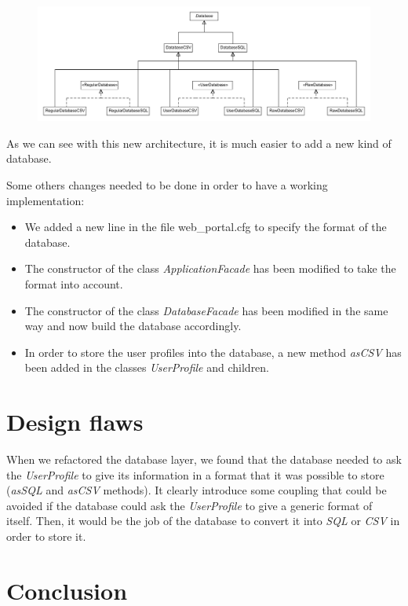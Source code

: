 \documentclass[a4paper,10pt]{report}
\begin{document}
\begin{figure}[h]
 \includegraphics[width=\textwidth]{ClassDiagram.png}
\end{figure}

As we can see with this new architecture, it is much easier to add a new kind of database.
\newline

\pagebreak

Some others changes needed to be done in order to have a working implementation:
\begin{itemize}
 \item We added a new line in the file web\_portal.cfg to specify the format of the database.
 \item The constructor of the class \textit{ApplicationFacade} has been modified to take the format into account.
 \item The constructor of the class \textit{DatabaseFacade} has been modified in the same way and now build the database accordingly.
 \item In order to store the user profiles into the database, a new method \textit{asCSV} has been added in the classes \textit{UserProfile} and children.
\end{itemize}



\chapter{Design flaws}

When we refactored the database layer, we found that the database needed to ask the \textit{UserProfile} to give its information in a format that it was possible to store (\textit{asSQL} and \textit{asCSV} methods). It clearly introduce some coupling that could be
avoided if the database could ask the \textit{UserProfile} to give a generic format of itself. Then, it would be the job of the database to convert it into \textit{SQL} or \textit{CSV} in order to store it.


\chapter{Conclusion}

\tableofcontents
\end{document}
